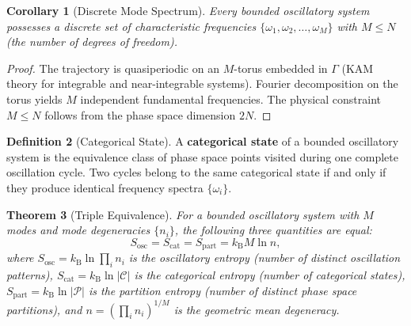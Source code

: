 \documentclass[11pt,a4paper]{article}
\newtheorem{theorem}{Theorem}[section]
\newtheorem{corollary}[theorem]{Corollary}
\theoremstyle{definition}
\newtheorem{definition}[theorem]{Definition}
\theoremstyle{remark}
\newcommand{\kB}{k_{\mathrm{B}}}
\newcommand{\Partition}{\mathcal{P}}
\newcommand{\Cat}{\mathcal{C}}
\begin{document}
\begin{corollary}[Discrete Mode Spectrum]
\label{cor:modes}
Every bounded oscillatory system possesses a discrete set of characteristic frequencies $\{\omega_1, \omega_2, \ldots, \omega_M\}$ with $M \leq N$ (the number of degrees of freedom).
\end{corollary}

\begin{proof}
The trajectory is quasiperiodic on an $M$-torus embedded in $\Gamma$ (KAM theory for integrable and near-integrable systems). Fourier decomposition on the torus yields $M$ independent fundamental frequencies. The physical constraint $M \leq N$ follows from the phase space dimension $2N$.
\end{proof}

\begin{definition}[Categorical State]
\label{def:catstate}
A \textbf{categorical state} of a bounded oscillatory system is the equivalence class of phase space points visited during one complete oscillation cycle. Two cycles belong to the same categorical state if and only if they produce identical frequency spectra $\{\omega_i\}$.
\end{definition}

\begin{theorem}[Triple Equivalence]
\label{thm:triple}
For a bounded oscillatory system with $M$ modes and mode degeneracies $\{n_i\}$, the following three quantities are equal:
\begin{equation}
S_{\mathrm{osc}} = S_{\mathrm{cat}} = S_{\mathrm{part}} = \kB M \ln n,
\end{equation}
where $S_{\mathrm{osc}} = \kB \ln \prod_i n_i$ is the oscillatory entropy (number of distinct oscillation patterns), $S_{\mathrm{cat}} = \kB \ln |\Cat|$ is the categorical entropy (number of categorical states), $S_{\mathrm{part}} = \kB \ln |\Partition|$ is the partition entropy (number of distinct phase space partitions), and $n = (\prod_i n_i)^{1/M}$ is the geometric mean degeneracy.
\end{theorem}
\end{document}
